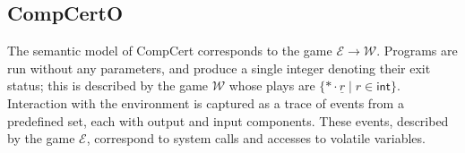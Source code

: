 \documentclass[sigplan,10pt,review,anonymous]{acmart}\settopmatter{printfolios=true,printccs=false,printacmref=false}
\newcommand{\kw}[1]{\ensuremath{ \mathsf{#1} }}
\begin{document}
%
%
%
%
%

\subsection{CompCertO} \label{sec:mainideas:compcerto} %

The semantic model of CompCert corresponds to
the game $\mathcal{E} \rightarrow \mathcal{W}$.
Programs are run without any parameters,
and produce a single integer denoting their exit status;
this is described by the game $\mathcal{W}$
whose plays are $\{ * \cdot \underline{r} \mid r \in \kw{int} \}$.
Interaction with the environment
is captured as a trace of events from a predefined set,
each with output and input components.
These events,
described by the game $\mathcal{E}$,
correspond to system calls and accesses to volatile variables.
\end{document}
